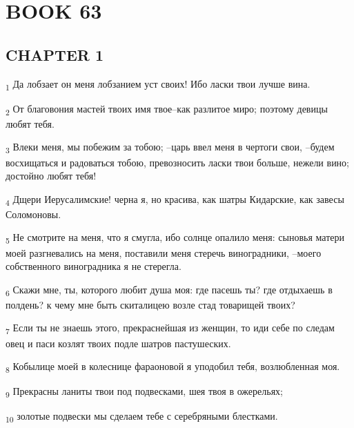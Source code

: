 \section{BOOK 63}
\subsection{CHAPTER 1}
\begin{tcolorbox}
\textsubscript{1} Да лобзает он меня лобзанием уст своих! Ибо ласки твои лучше вина.
\end{tcolorbox}
\begin{tcolorbox}
\textsubscript{2} От благовония мастей твоих имя твое--как разлитое миро; поэтому девицы любят тебя.
\end{tcolorbox}
\begin{tcolorbox}
\textsubscript{3} Влеки меня, мы побежим за тобою; --царь ввел меня в чертоги свои, --будем восхищаться и радоваться тобою, превозносить ласки твои больше, нежели вино; достойно любят тебя!
\end{tcolorbox}
\begin{tcolorbox}
\textsubscript{4} Дщери Иерусалимские! черна я, но красива, как шатры Кидарские, как завесы Соломоновы.
\end{tcolorbox}
\begin{tcolorbox}
\textsubscript{5} Не смотрите на меня, что я смугла, ибо солнце опалило меня: сыновья матери моей разгневались на меня, поставили меня стеречь виноградники, --моего собственного виноградника я не стерегла.
\end{tcolorbox}
\begin{tcolorbox}
\textsubscript{6} Скажи мне, ты, которого любит душа моя: где пасешь ты? где отдыхаешь в полдень? к чему мне быть скиталицею возле стад товарищей твоих?
\end{tcolorbox}
\begin{tcolorbox}
\textsubscript{7} Если ты не знаешь этого, прекраснейшая из женщин, то иди себе по следам овец и паси козлят твоих подле шатров пастушеских.
\end{tcolorbox}
\begin{tcolorbox}
\textsubscript{8} Кобылице моей в колеснице фараоновой я уподобил тебя, возлюбленная моя.
\end{tcolorbox}
\begin{tcolorbox}
\textsubscript{9} Прекрасны ланиты твои под подвесками, шея твоя в ожерельях;
\end{tcolorbox}
\begin{tcolorbox}
\textsubscript{10} золотые подвески мы сделаем тебе с серебряными блестками.
\end{tcolorbox}
